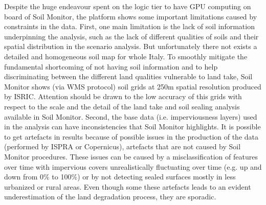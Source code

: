 \documentclass[APA,LATO1COL,doublespace]{WileyNJD-v2}
\newcommand{\toberevised}[1]{\emph{\textcolor{red}{#1}}} %
\begin{document}
Despite the huge endeavour spent on the logic tier to have GPU computing on board of Soil Monitor, the platform shows some important limitations caused by constraints in the data.
First, one main limitation is the lack of soil information underpinning the analysis, %
such as the lack of different qualities of soils and their spatial distribution in the scenario analysis.
But unfortunately there not exists a detailed and homogeneous soil map for whole Italy.
To smoothly mitigate the fundamental shortcoming of not having soil information and to help discriminating between the different land qualities vulnerable to land take, Soil Monitor shows (via WMS protocol) soil grids at 250m spatial resolution produced by ISRIC.
Attention should be drawn to the low accuracy of this grids with respect to the scale and the detail of the land take and soil sealing analysis available in Soil Monitor.
Second, the base data (i.e. imperviousness layers) used in the analysis can have inconsistencies that Soil Monitor highlights.
It is possible to get artefacts in results %
because of possible issues in the production of the data (performed by ISPRA or Copernicus), artefacts that are not caused by Soil Monitor procedures. %
These issues can be caused by a misclassification of features over time with impervious covers unrealistically fluctuating over time (e.g. up and down from 0\% to 100\%) or by not detecting sealed surfaces mostly in less urbanized or rural areas.
Even though some these artefacts leads to an evident underestimation of the land degradation process, they are sporadic.
\end{document}
